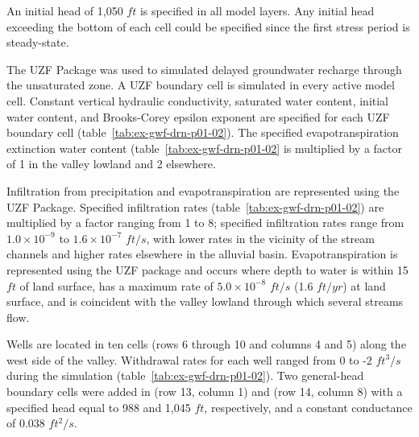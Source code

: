 An initial head of 1,050 $ft$ is specified in all model layers. Any initial head exceeding the bottom of each cell could be specified since the first stress period is steady-state.

The UZF Package was used to simulated delayed groundwater recharge through the unsaturated zone. A UZF boundary cell is simulated in every active model cell. Constant vertical hydraulic conductivity, saturated water content, initial water content, and Brooks-Corey epsilon exponent \citep{brookscorey1966} are specified for each UZF boundary cell (table~\ref{tab:ex-gwf-drn-p01-02}). The specified evapotranspiration extinction water content (table~\ref{tab:ex-gwf-drn-p01-02} is multiplied by a factor of 1 in the valley lowland and 2 elsewhere. 



Infiltration from precipitation and evapotranspiration are represented using the UZF Package. Specified infiltration rates (table~\ref{tab:ex-gwf-drn-p01-02}) are multiplied by a factor ranging from 1 to 8; specified infiltration rates range from $1.0 \times 10^{-9}$ to $1.6 \times 10^{-7}$ $ft/s$, with lower rates in the vicinity of the stream channels and higher rates elsewhere in the alluvial basin. Evapotranspiration is represented using the UZF package and occurs where depth to water is within 15 $ft$ of land surface, has a maximum rate of $5.0 \times 10^{-8}$ $ft/s$ (1.6 $ft/yr$) at land surface, and is coincident with the valley lowland through which several streams flow. 

Wells are  located in ten cells (rows 6 through 10 and columns 4 and 5) along the west side of the valley. Withdrawal rates for each well ranged from 0 to -2 $ft^{3}/s$ during the simulation (table~\ref{tab:ex-gwf-drn-p01-02}). Two general-head boundary cells were added in (row 13, column 1) and (row 14, column 8) with a specified head equal to 988 and 1,045 $ft$, respectively, and a constant conductance of 0.038 $ft^{2}/s$.

